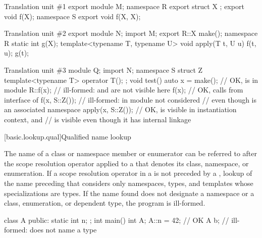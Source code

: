 \pnum
\begin{example}
\begin{codeblocktu}{Translation unit \#1}
export module M;
namespace R {
  export struct X {};
  export void f(X);
}
namespace S {
  export void f(X, X);
}
\end{codeblocktu}

\begin{codeblocktu}{Translation unit \#2}
export module N;
import M;
export R::X make();
namespace R { static int g(X); }
template<typename T, typename U> void apply(T t, U u) {
  f(t, u);
  g(t);
}
\end{codeblocktu}

\begin{codeblocktu}{Translation unit \#3}
module Q;
import N;
namespace S {
  struct Z { template<typename T> operator T(); };
}
void test() {
  auto x = make();              // OK,  is  in module 
  R::f(x);                      // ill-formed:  and  are not visible here
  f(x);                         // OK, calls  from interface of 
  f(x, S::Z());                 // ill-formed:  in module  not considered
                                // even though  is an associated namespace
  apply(x, S::Z());             // OK,  is visible in instantiation context, and
                                //  is visible even though it has internal linkage
}
\end{codeblocktu}
\end{example}

[basic.lookup.qual]{Qualified name lookup}

\pnum
{}%
%
%
The name of a class or namespace member
or enumerator can be referred to after the
\tcode{::} scope resolution operator applied to a
 that denotes its class,
namespace, or enumeration.
If a
\tcode{::} scope resolution
operator
in a  is not preceded by a ,
lookup of the name preceding that \tcode{::} considers only namespaces, types, and
templates whose specializations are types. If the
name found does not designate a namespace or a class, enumeration, or dependent type,
the program is ill-formed. \begin{example}

\begin{codeblock}
class A {
public:
  static int n;
};
int main() {
  int A;
  A::n = 42;        // OK
  A b;              // ill-formed:  does not name a type
}
\end{codeblock}
\end{example}

